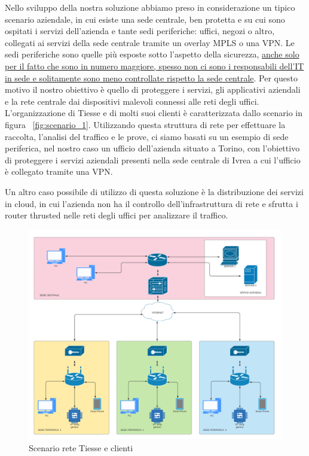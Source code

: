 Nello sviluppo della nostra soluzione abbiamo preso in considerazione un tipico scenario aziendale, in cui esiste una sede centrale, ben protetta e su cui sono ospitati i servizi dell'azienda e tante sedi periferiche: uffici, negozi o altro, collegati ai servizi della sede centrale tramite un overlay MPLS o una VPN.
Le sedi periferiche sono quelle più esposte sotto l'aspetto della sicurezza, \uline{anche solo per il fatto che sono in numero maggiore, spesso non ci sono i responsabili dell'IT in sede e solitamente sono meno controllate rispetto la sede centrale}. Per questo motivo il nostro obiettivo è quello di proteggere i servizi, gli applicativi aziendali e la rete centrale dai dispositivi malevoli connessi alle reti degli uffici.
L'organizzazione di Tiesse e di molti suoi clienti è caratterizzata dallo scenario in figura ~\ref{fig:scenario_1}. Utilizzando questa struttura di rete per effettuare la raccolta, l'analisi del traffico e le prove, ci siamo basati su un esempio di sede periferica, nel nostro caso un ufficio dell'azienda situato a Torino, con l'obiettivo di proteggere i servizi aziendali presenti nella sede centrale di Ivrea a cui l'ufficio è collegato tramite una VPN.

Un altro caso possibile di utilizzo di questa soluzione è la distribuzione dei servizi in cloud, in cui l'azienda non ha il controllo dell'infrastruttura di rete e sfrutta i router thrusted nelle reti degli uffici per analizzare il traffico.


\begin{figure}[]
    \label{fig:scenario_2}
    \includegraphics[width=\hsize]{images/introduzione/scenario.png}
    \caption{Scenario rete Tiesse e clienti}
    \centering
\end{figure}

